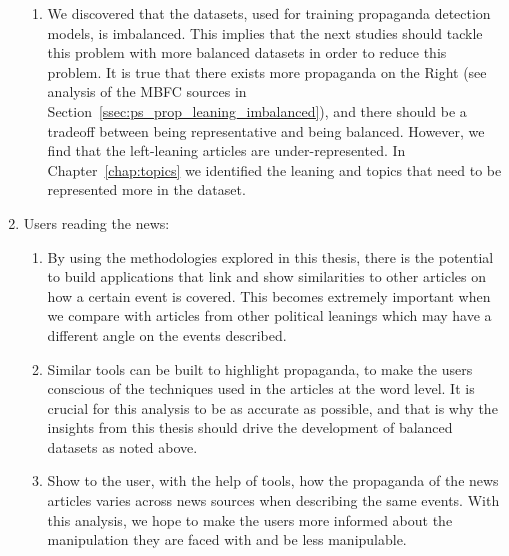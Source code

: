 \begin{enumerate}
\begin{enumerate}
        \item %
        We discovered that the datasets, used for training propaganda detection models, is imbalanced. This implies that the next studies should tackle this problem with more balanced datasets in order to reduce this problem.
        It is true that there exists more propaganda on the Right (see analysis of the MBFC sources in Section~\ref{ssec:ps_prop_leaning_imbalanced}), and there should be a tradeoff between being representative and being balanced. However, we find that the left-leaning articles are under-represented.
        In Chapter~\ref{chap:topics} we identified the leaning and topics that need to be represented more in the dataset. %
    \end{enumerate}%
    \item Users reading the news:
    \begin{enumerate}
        \item By using the methodologies explored in this thesis, there is the potential to build applications that link and show similarities to other articles on how a certain event is covered.
        This becomes extremely important when we compare with articles from other political leanings which may have a different angle on the events described.
        \item Similar tools can be built to highlight propaganda, to make the users conscious of the techniques used in the articles at the word level. It is crucial for this analysis to be as accurate as possible, and that is why the insights from this thesis should drive the development of balanced datasets as noted above. 
        \item Show to the user, with the help of tools, how the propaganda of the news articles varies across news sources when describing the same events. With this analysis, we hope to make the users more informed about the manipulation they are faced with and be less manipulable.
    \end{enumerate}
\end{enumerate}

